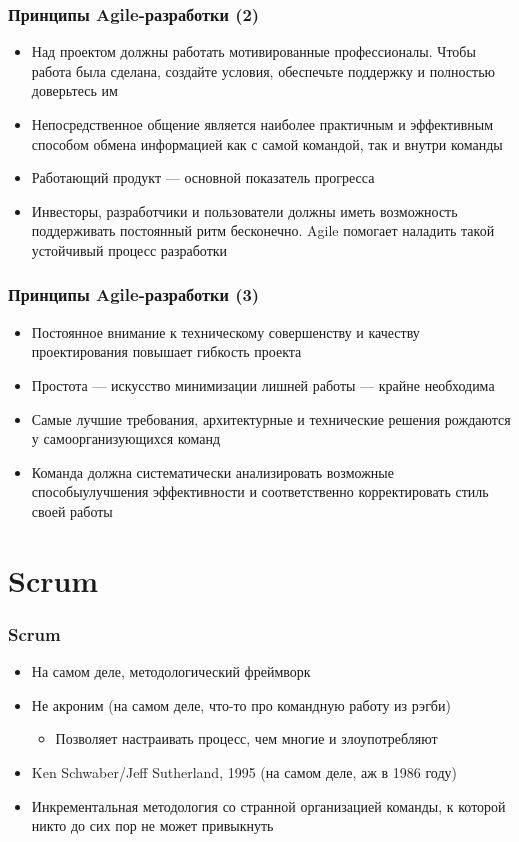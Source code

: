 \documentclass[xetex,mathserif,serif]{beamer}
\begin{document}
    \begin{frame}
        \frametitle{Принципы Agile-разработки (2)}
        \begin{itemize}
            \item Над проектом должны работать мотивированные профессионалы. Чтобы работа была сделана, создайте условия, обеспечьте поддержку и полностью доверьтесь им
            \item Непосредственное общение является наиболее практичным и эффективным способом обмена информацией как с самой командой, так и внутри команды
            \item Работающий продукт --- основной показатель прогресса
            \item Инвесторы, разработчики и пользователи должны иметь возможность поддерживать постоянный ритм бесконечно. Agile помогает наладить такой устойчивый процесс разработки
        \end{itemize}
    \end{frame}

    \begin{frame}
        \frametitle{Принципы Agile-разработки (3)}
        \begin{itemize}
            \item Постоянное внимание к техническому совершенству и качеству проектирования повышает гибкость проекта
            \item Простота --- искусство минимизации лишней работы --- крайне необходима
            \item Самые лучшие требования, архитектурные и технические решения рождаются у самоорганизующихся команд
            \item Команда должна систематически анализировать возможные способыулучшения эффективности и соответственно корректировать стиль своей работы
        \end{itemize}
    \end{frame}

    \section{Scrum}

    \begin{frame}
        \frametitle{Scrum}
        \begin{itemize}
            \item На самом деле, методологический фреймворк
            \item Не акроним (на самом деле, что-то про командную работу из рэгби)
            \begin{itemize}
                \item Позволяет настраивать процесс, чем многие и злоупотребляют
            \end{itemize}
            \item Ken Schwaber/Jeff Sutherland, 1995 (на самом деле, аж в 1986 году)
            \item Инкрементальная методология со странной организацией команды, к которой никто до сих пор не может привыкнуть
        \end{itemize}
    \end{frame}
\end{document}
